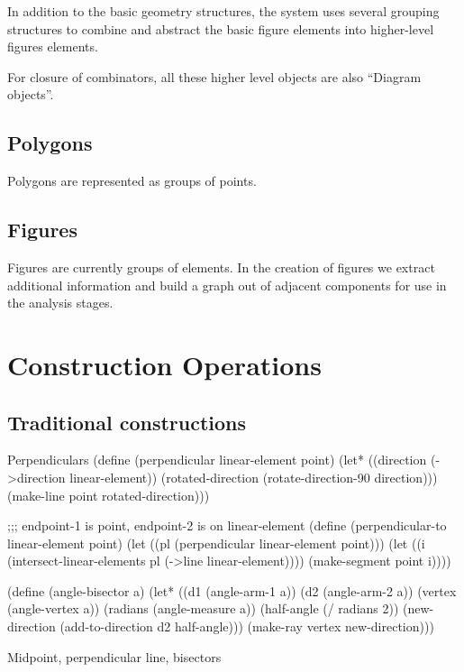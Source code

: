In addition to the basic geometry structures, the system uses several
grouping structures to combine and abstract the basic figure elements
into higher-level figures elements.

For closure of combinators, all these higher level objects are also
``Diagram objects''.

\subsection{Polygons}

Polygons are represented as groups of points.

\subsection{Figures}

Figures are currently groups of elements. In the creation of figures
we extract additional information and build a graph out of adjacent
components for use in the analysis stages.

\section{Construction Operations}

\subsection{Traditional constructions}

\begin{code-listing}{Perpendiculars}
(define (perpendicular linear-element point)
  (let* ((direction (->direction linear-element))
         (rotated-direction (rotate-direction-90 direction)))
    (make-line point rotated-direction)))

;;; endpoint-1 is point, endpoint-2 is on linear-element
(define (perpendicular-to linear-element point)
  (let ((pl (perpendicular linear-element point)))
    (let ((i (intersect-linear-elements pl (->line linear-element))))
      (make-segment point i))))

(define (angle-bisector a)
  (let* ((d1 (angle-arm-1 a))
         (d2 (angle-arm-2 a))
         (vertex (angle-vertex a))
         (radians (angle-measure a))
         (half-angle (/ radians 2))
         (new-direction (add-to-direction d2 half-angle)))
    (make-ray vertex new-direction)))
\end{code-listing}

Midpoint, perpendicular line, bisectors

